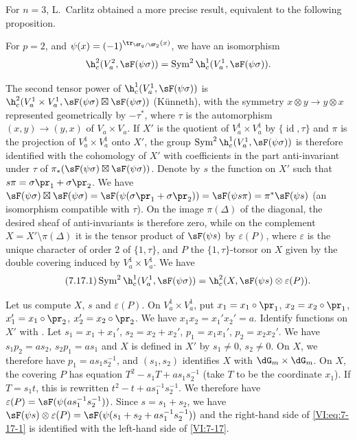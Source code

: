 For $n=3$, L.\ Carlitz \cite{ca69-2} obtained a more precise result, 
equivalent to the following proposition. 





\begin{proposition_}\label{VI:7-17}
For $p=2$, and $\psi(x)=(-1)^{\tr_{\dF_q/\dF_2}(x)}$, we have an isomorphism 
\[
  \h_c^2(V_a^2,\sF(\psi\sigma)) = \operatorname{Sym}^2 \h_c^1(V_a^1,\sF(\psi\sigma)) \text{.} 
\]
\end{proposition_}

The second tensor power of $\h_c^1(V_a^1,\sF(\psi\sigma))$ is 
$\h_c^2(V_a^1\times V_a^1,\sF(\psi\sigma)\boxtimes \sF(\psi\sigma))$ 
(K\"unneth), with the symmetry $x\otimes y\to y\otimes x$ represented 
geometrically by $-\tau^\ast$, where $\tau$ is the automorphism 
$(x,y)\to (y,x)$ of $V_a\times V_a$. If $X'$ is the quotient of 
$V_a^1\times V_a^1$ by $\{\operatorname{id}{},\tau\}$ and $\pi$ is the 
projection of $V_a^1\times V_a^1$ onto $X'$, the group 
$\operatorname{Sym}^2 \h_c^1(V_a^1,\sF(\psi\sigma))$ is therefore identified with the 
cohomology of $X'$ with coefficients in the part anti-invariant under $\tau$ of 
$\pi_\ast(\sF(\psi\sigma)\boxtimes \sF(\psi\sigma))$. Denote by $s$ the function 
on $X'$ such that $s\pi =\sigma\pr_1+\sigma\pr_2$. We have 
$\sF(\psi\sigma)\boxtimes \sF(\psi\sigma) = \sF(\psi(\sigma\pr_1+\sigma\pr_2)) = \sF(\psi s \pi) = \pi^\ast \sF(\psi s)$ 
(an isomorphism compatible with $\tau$). On the image $\pi(\Delta)$ of the 
diagonal, the desired sheaf of anti-invariants is therefore zero, while on 
the complement $X=X'\setminus \pi(\Delta)$ it is the tensor product of 
$\sF(\psi s)$ by $\varepsilon(P)$, where $\varepsilon$ is the unique character 
of order $2$ of $\{1,\tau\}$, and $P$ the $\{1,\tau\}$-torsor on $X$ given by the 
double covering induced by $V_a^1\times V_a^1$. We have 
\begin{equation*}\tag{7.17.1}\label{VI:eq:7-17-1}
  \operatorname{Sym}^2 \h_c^1(V_a^1,\sF(\psi\sigma)) = \h_c^2(X,\sF(\psi s)\otimes \varepsilon(P)) \text{.}
\end{equation*}

Let us compute $X$, $s$ and $\varepsilon(P)$. On $V_a^1\times V_a^1$, put 
$x_1=x_1\circ\pr_1$, $x_2=x_2\circ\pr_1$, $x_1'=x_1\circ \pr_2$, 
$x_2'=x_2\circ \pr_2$. We have $x_1 x_2=x_1'x_2'=a$. Identify functions on 
$X'$ with . Let $s_1=x_1+x_1'$, 
$s_2=x_2+x_2'$, $p_1=x_1 x_1'$, $p_2=x_2 x_2'$. We have $s_1 p_2 = a s_2$, 
$s_2 p_1 = a s_1$ and $X$ is defined in $X'$ by $s_1\ne 0$, $s_2\ne 0$. On 
$X$, we therefore have $p_1 = a s_1 s_2^{-1}$, and $(s_1,s_2)$ identifies $X$ with 
$\dG_m\times \dG_m$. On $X$, the covering $P$ has equation 
$T^2-s_1 T+a s_1 s_2^{-1}$ (take $T$ to be the coordinate $x_1$). If 
$T=s_1 t$, this is rewritten $t^2-t+a s_1^{-1} s_2^{-1}$. We therefore have 
$\varepsilon(P) = \sF(\psi(a s_1^{-1} s_2^{-1}))$. Since $s=s_1+s_2$, we have 
$\sF(\psi s)\otimes \varepsilon(P) = \sF(\psi(s_1+s_2+ a s_1^{-1} s_2^{-1}))$ 
and the right-hand side of \eqref{VI:eq:7-17-1} is identified with the left-hand side of 
\ref{VI:7-17}. 


